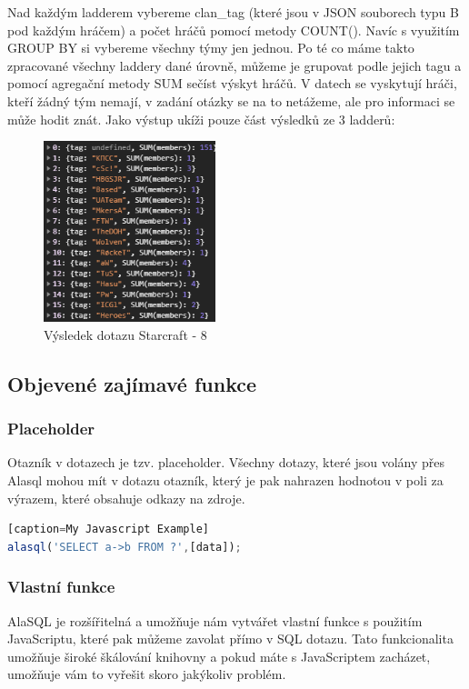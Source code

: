 \documentclass[a4, titlepage]{article}
\begin{document}
Nad každým ladderem vybereme clan\_tag (které jsou v JSON souborech typu B pod každým hráčem) a počet hráčů pomocí metody COUNT(). Navíc s využitím GROUP BY si vybereme všechny týmy jen jednou.
Po té co máme takto zpracované všechny laddery dané úrovně, můžeme je grupovat podle jejich tagu a pomocí agregační metody SUM sečíst výskyt hráčů. V datech se vyskytují hráči, kteří žádný tým nemají, v zadání otázky se na to netážeme, ale pro informaci se může hodit znát. Jako výstup ukíži pouze část výsledků ze 3 ladderů:
\newpage
\begin{figure}[h]
    \centering
    \includegraphics[width=5cm]{S8}
    \caption{Výsledek dotazu Starcraft - 8}
\end{figure} 


\subsection{Objevené zajímavé funkce}
\subsubsection*{Placeholder}
Otazník v dotazech je tzv. placeholder. Všechny dotazy, které jsou volány přes Alasql mohou mít v dotazu otazník, který je pak nahrazen hodnotou v poli za výrazem, které obsahuje odkazy na zdroje.

\begin{lstlisting}[language=JavaScript][caption=My Javascript Example]
alasql('SELECT a->b FROM ?',[data]);
\end{lstlisting}

\subsubsection*{Vlastní funkce}
AlaSQL je rozšířitelná a umožňuje nám vytvářet vlastní funkce s použitím JavaScriptu, které pak můžeme zavolat přímo v SQL dotazu. Tato funkcionalita umožňuje široké škálování knihovny a pokud máte s JavaScriptem zacházet, umožňuje vám to vyřešit skoro jakýkoliv problém.
\end{document}
